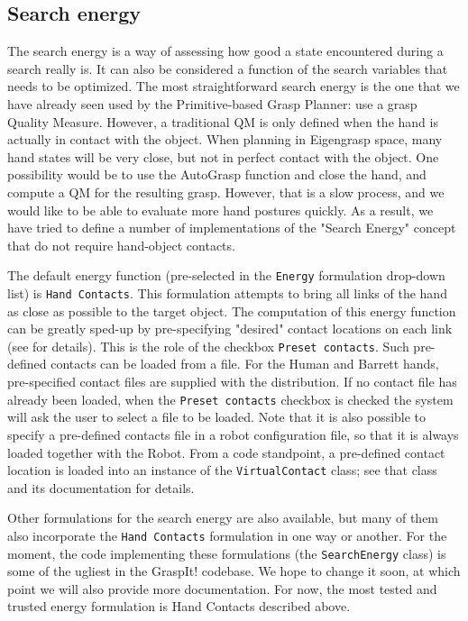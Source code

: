 \subsection{Search energy}

The search energy is a way of assessing how good a state encountered
during a search really is. It can also be considered a function of the
search variables that needs to be optimized. The most straightforward
search energy is the one that we have already seen used by the
Primitive-based Grasp Planner: use a grasp Quality Measure. However, a
traditional QM is only defined when the hand is actually in contact
with the object. When planning in Eigengrasp space, many hand states
will be very close, but not in perfect contact with the object. One
possibility would be to use the AutoGrasp function and close the hand,
and compute a QM for the resulting grasp. However, that is a slow
process, and we would like to be able to evaluate more hand postures
quickly. As a result, we have tried to define a number of
implementations of the "Search Energy" concept that do not require
hand-object contacts.

The default energy function (pre-selected in the \texttt{Energy}
formulation drop-down list) is \texttt{Hand Contacts}. This
formulation attempts to bring all links of the hand as close as
possible to the target object. The computation of this energy function
can be greatly sped-up by pre-specifying "desired" contact locations
on each link (see  for
details). This is the role of the checkbox \texttt{Preset
  contacts}. Such pre-defined contacts can be loaded from a file. For
the Human and Barrett hands, pre-specified contact files are supplied
with the distribution. If no contact file has already been loaded,
when the \texttt{Preset contacts} checkbox is checked the system will
ask the user to select a file to be loaded. Note that it is also
possible to specify a pre-defined contacts file in a robot
configuration file, so that it is always loaded together with the
Robot. From a code standpoint, a pre-defined contact location is
loaded into an instance of the \texttt{VirtualContact} class; see that
class and its documentation for details.

Other formulations for the search energy are also available, but many
of them also incorporate the \texttt{Hand Contacts} formulation in one
way or another. For the moment, the code implementing these
formulations (the \texttt{SearchEnergy} class) is some of the ugliest
in the GraspIt!  codebase. We hope to change it soon, at which point
we will also provide more documentation. For now, the most tested and
trusted energy formulation is Hand Contacts described above.

